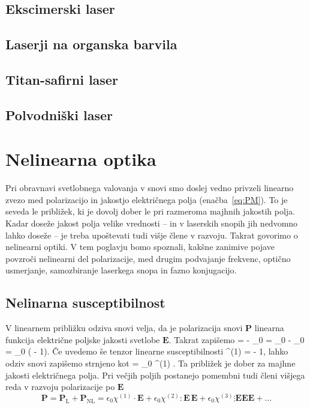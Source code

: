 \documentclass[11pt,fleqn]{book} %
\begin{document}
\section{Ekscimerski laser}
\section{Laserji na organska barvila}
\section{Titan-safirni laser}
\section{Polvodniški laser}


\chapter{Nelinearna optika}

Pri obravnavi svetlobnega valovanja v snovi smo doslej vedno privzeli linearno 
zvezo med polarizacijo in jakostjo električnega polja (enačba~\ref{eq:PM}). To 
je seveda le približek, ki je dovolj dober le pri razmeroma majhnih jakostih
polja. Kadar doseže jakost polja velike vrednosti -- in v laserskih snopih
jih nedvomno lahko doseže -- je treba upoštevati tudi višje člene v razvoju. Takrat
govorimo o nelinearni optiki. V tem poglavju bomo spoznali, 
kakšne zanimive pojave povzroči nelinearni del polarizacije, med drugim podvajanje frekvenc,
optično usmerjanje, samozbiranje laserkega snopa in fazno konjugacijo. 

\section{Nelinarna susceptibilnost}
V linearnem približku odziva snovi velja, da je polarizacija snovi $\mathbf{P}$ linearna 
funkcija električne poljske jakosti svetlobe $\mathbf{E}$. Takrat zapišemo
\beq
{} =  - \varepsilon_0  = 
\varepsilon_0 \underline{\epsilon} \cdot{} - \varepsilon_0  = 
\varepsilon_0 (\underline{\epsilon} - 1)\cdot{}. 
\eeq
Če uvedemo še tenzor linearne susceptibilnosti
\beq
\chi^{(1)} = \underline{\epsilon} - 1,
\eeq
lahko odziv snovi zapišemo strnjeno kot
\beq
{} =  \varepsilon_0 \chi^{(1)} \cdot {}.
\eeq
Ta približek je dober za majhne jakosti električnega polja. Pri večjih poljih
postanejo pomembni tudi členi višjega reda v razvoju polarizacije
po $\mathbf{E}$
\begin{equation}
\mathbf{P}=\mathbf{P}_{\mathrm{L}}+\mathbf{P}_{\mathrm{NL}}=
\epsilon_{0} \chi^{(1)}\cdot \mathbf{E}+
\epsilon_{0}\chi^{(2)}:\mathbf{E}\, \mathbf{E}+
\epsilon_{0}\chi^{(3)}\vdots \mathbin \mathbf{E}\mathbin \mathbf{E}\mathbin\mathbf{E} + \dots
\label{8.1}
\end{equation}
\end{document}
